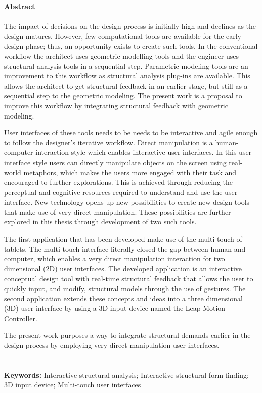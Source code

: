 \null\vfill

{\Huge \textbf{Abstract}} \\ \\

The impact of decisions on the design process is initially high and declines as the design matures. However, few computational tools are available for the early design phase; thus, an opportunity exists to create such tools. In the conventional workflow the architect uses geometric modelling tools and the engineer uses structural analysis tools in a sequential step. Parametric modeling tools are an improvement to this workflow as structural analysis plug-ins are available. This allows the architect to get structural feedback in an earlier stage, but still as a sequential step to the geometric modeling. The present work is a proposal to improve this workflow by integrating structural feedback with geometric modeling.
 
User interfaces of these tools needs to be needs to be interactive and agile enough to follow the designer’s iterative workflow. Direct manipulation is a human-computer interaction style which enables interactive user interfaces. In this user interface style users can directly manipulate objects on the screen using real-world metaphors, which makes the users more engaged with their task and encouraged to further explorations. This is achieved through reducing the perceptual and cognitive resources required to understand and use the user interface. New technology opens up new possibilities to create new design tools that make use of very direct manipulation. These possibilities are further explored in this thesis through development of two such tools. 

The first application that has been developed make use of the multi-touch of tablets. The multi-touch interface literally closed the gap between human and computer, which enables a very direct manipulation interaction for two dimensional (2D) user interfaces. The developed application is an interactive conceptual design tool with real-time structural feedback that allows the user to quickly input, and modify, structural models through the use of gestures. The second application extends these concepts and ideas into a three dimensional (3D) user interface by using a 3D input device named the Leap Motion Controller. 

The present work purposes a way to integrate structural demands earlier in the design process by employing very direct manipulation user interfaces.
\\
\\
\\
\textbf{Keywords:} Interactive structural analysis; Interactive structural form finding; 3D input device; Multi-touch user interfaces



\vfill\vfill\vfill\vfill\null